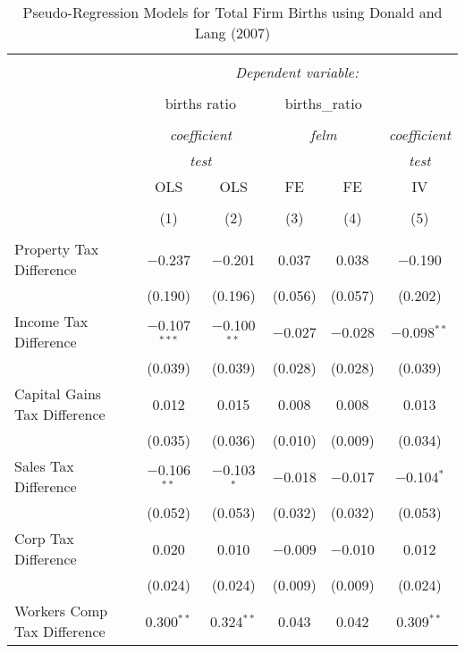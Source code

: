 
\begin{table}[!htbp] \centering 
  \caption{Pseudo-Regression Models for  Total Firm Births using Donald and Lang (2007)} 
  \label{} 
\begin{tabular}{@{\extracolsep{5pt}}lccccc} 
\\[-1.8ex]\hline 
\hline \\[-1.8ex] 
 & \multicolumn{5}{c}{\textit{Dependent variable:}} \\ 
\cline{2-6} 
\\[-1.8ex] & \multicolumn{2}{c}{births ratio} & \multicolumn{2}{c}{births\_ratio} &   \\ 
\\[-1.8ex] & \multicolumn{2}{c}{\textit{coefficient}} & \multicolumn{2}{c}{\textit{felm}} & \textit{coefficient} \\ 
 & \multicolumn{2}{c}{\textit{test}} & \multicolumn{2}{c}{\textit{}} & \textit{test} \\ 
 & OLS & OLS & FE & FE & IV \\ 
\\[-1.8ex] & (1) & (2) & (3) & (4) & (5)\\ 
\hline \\[-1.8ex] 
 Property Tax Difference & $-$0.237 & $-$0.201 & 0.037 & 0.038 & $-$0.190 \\ 
  & (0.190) & (0.196) & (0.056) & (0.057) & (0.202) \\ 
  Income Tax Difference & $-$0.107$^{***}$ & $-$0.100$^{**}$ & $-$0.027 & $-$0.028 & $-$0.098$^{**}$ \\ 
  & (0.039) & (0.039) & (0.028) & (0.028) & (0.039) \\ 
  Capital Gains Tax Difference & 0.012 & 0.015 & 0.008 & 0.008 & 0.013 \\ 
  & (0.035) & (0.036) & (0.010) & (0.009) & (0.034) \\ 
  Sales Tax Difference & $-$0.106$^{**}$ & $-$0.103$^{*}$ & $-$0.018 & $-$0.017 & $-$0.104$^{*}$ \\ 
  & (0.052) & (0.053) & (0.032) & (0.032) & (0.053) \\ 
  Corp Tax Difference & 0.020 & 0.010 & $-$0.009 & $-$0.010 & 0.012 \\ 
  & (0.024) & (0.024) & (0.009) & (0.009) & (0.024) \\ 
  Workers Comp Tax Difference & 0.300$^{**}$ & 0.324$^{**}$ & 0.043 & 0.042 & 0.309$^{**}$ \\ 

\end{tabular}
\end{table}
